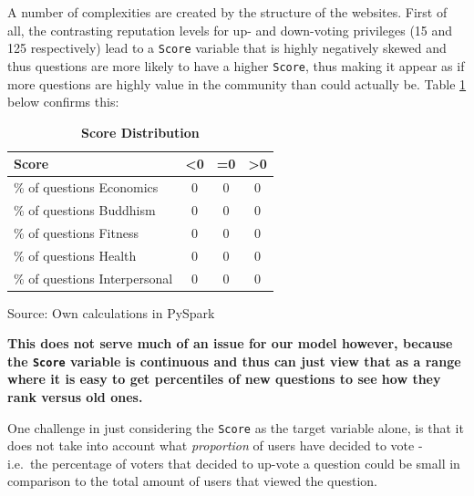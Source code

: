 \documentclass[11pt,preprint, authoryear]{article}
\numberwithin{equation}{section}
\numberwithin{figure}{section}
\begin{document}

A number of complexities are created by the structure of the websites.
First of all, the contrasting reputation levels for up- and down-voting
privileges (15 and 125 respectively) lead to a \texttt{Score} variable
that is highly negatively skewed and thus questions are more likely to
have a higher \texttt{Score}, thus making it appear as if more questions
are highly value in the community than could actually be. Table
\ref{tab:score_table} below confirms this:

\footnotesize

\begin{longtable}[htbp] {@{} lccc @{}} 
\caption{\textbf{Score Distribution}} 
\label{tab:score_table} \\
\hline \hline
\textbf{Score} &  \textbf{<0} &  \textbf{=0} &  \textbf{>0} \\
\hline \hline
\% of questions Economics    &              0 &              0 &                0 \\
\% of questions Buddhism      &              0 &              0 &                0 \\
\% of questions Fitness       &              0 &              0 &                0 \\
\% of questions Health        &              0 &              0 &                0 \\
\% of questions Interpersonal &              0 &              0 &                0 \\
\hline \hline
\end{longtable}\begin{center} Source: Own calculations in PySpark\end{center}

\normalsize

\textbf{This does not serve much of an issue for our model however,
because the \texttt{Score} variable is continuous and thus can just view
that as a range where it is easy to get percentiles of new questions to
see how they rank versus old ones.}

One challenge in just considering the \texttt{Score} as the target
variable alone, is that it does not take into account what
\emph{proportion} of users have decided to vote - i.e.~the percentage of
voters that decided to up-vote a question could be small in comparison
to the total amount of users that viewed the question.
\end{document}
